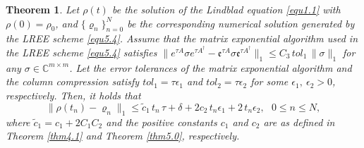 \documentclass[preprint,3p,compress,12pt]{elsarticle}
\numberwithin{equation}{section}
\newtheorem{theorem}{Theorem}[section]
\numberwithin{figure}{section}
\begin{document}
\begin{theorem}\label{thm5.1}
  Let $\rho(t)$ be the solution of the Lindblad equation \eqref{equ1.1} with $\rho(0)=\rho_0$, and $\{\varrho_n\}_{n=0}^N$ be the corresponding numerical solution generated by the LREE scheme \eqref{equ5.4}. Assume that the matrix exponential algorithm used in the LREE scheme \eqref{equ5.4} satisfies
 $\|e^{\tau A}\sigma e^{\tau A^{\dag}}-\mathfrak{e}^{\tau A}\sigma\mathfrak{e}^{\tau A^{\dag}}\|_1\leq C_3\, tol_1\, \|\sigma\|_1$ for any $\sigma\in \mathbb{C}^{m\times m}$. Let the error tolerances of  the matrix exponential algorithm  and the column compression satisfy $tol_1=\tau\epsilon_1$ and $tol_2=\tau\epsilon_2$ for some $\epsilon_1,~\epsilon_2>0$, respectively. Then, it holds that
  \[\|\rho(t_n)-\varrho_n\|_1\leq \tilde{c}_1 \, t_n \, \tau+\delta+2c_2 \, t_n\epsilon_1
  +2 \, t_n\epsilon_2,~~~0\leq n\leq N,\]
  where $\tilde{c}_1=c_1+2C_1C_2$ and the positive constants $c_1$ and $c_2$ are as defined in Theorem \ref{thm4.1} and Theorem \ref{thm5.0}, respectively.
\end{theorem}
\end{document}
